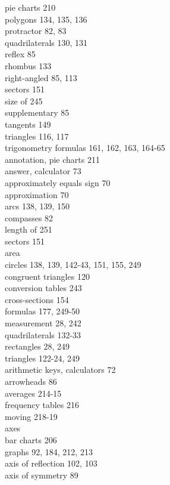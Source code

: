 \documentclass[10pt]{article}
\begin{document}
pie charts 210\\
polygons 134, 135, 136\\
protractor 82, 83\\
quadrilaterals 130, 131\\
reflex 85\\
rhombus 133\\
right-angled 85, 113\\
sectors 151\\
size of 245\\
supplementary 85\\
tangents 149\\
triangles 116, 117\\
trigonometry formulas 161, 162, 163, 164-65\\
annotation, pie charts 211\\
answer, calculator 73\\
approximately equals sign 70\\
approximation 70\\
arcs 138, 139, 150\\
compasses 82\\
length of 251\\
sectors 151\\
area\\
circles 138, 139, 142-43, 151, 155, 249\\
congruent triangles 120\\
conversion tables 243\\
cross-sections 154\\
formulas 177, 249-50\\
measurement 28, 242\\
quadrilaterals 132-33\\
rectangles 28, 249\\
triangles 122-24, 249\\
arithmetic keys, calculators 72\\
arrowheads 86\\
averages 214-15\\
frequency tables 216\\
moving 218-19\\
axes\\
bar charts 206\\
graphs 92, 184, 212, 213\\
axis of reflection 102, 103\\
axis of symmetry 89
\end{document}
